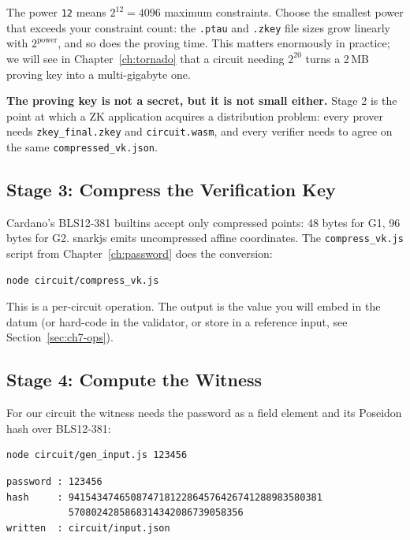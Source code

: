 The power \texttt{12} means $2^{12} = 4096$ maximum constraints. Choose the
smallest power that exceeds your constraint count: the \texttt{.ptau} and
\texttt{.zkey} file sizes grow linearly with $2^{\text{power}}$, and so does the
proving time. This matters enormously in practice; we will see in
Chapter~\ref{ch:tornado} that a circuit needing $2^{20}$ turns a 2\,MB
proving key into a multi-gigabyte one.

\begin{highlight}
\textbf{The proving key is not a secret, but it is not small either.}
Stage 2 is the point at which a ZK application acquires a distribution problem:
every prover needs \texttt{zkey\_final.zkey} and \texttt{circuit.wasm}, and
every verifier needs to agree on the same \texttt{compressed\_vk.json}.
\end{highlight}

\subsection*{Stage 3: Compress the Verification Key}

Cardano's BLS12-381 builtins accept only compressed points: 48 bytes for G1,
96 bytes for G2. snarkjs emits uncompressed affine coordinates. The
\texttt{compress\_vk.js} script from Chapter~\ref{ch:password} does the
conversion:

\begin{verbatim}
node circuit/compress_vk.js
\end{verbatim}

This is a per-circuit operation. The output is the value you will embed in the
datum (or hard-code in the validator, or store in a reference input, see
Section~\ref{sec:ch7-ops}).

\subsection*{Stage 4: Compute the Witness}

For our circuit the witness needs the password as a field element and its
Poseidon hash over BLS12-381:

\begin{verbatim}
node circuit/gen_input.js 123456
\end{verbatim}

\begin{verbatim}
password : 123456
hash     : 941543474650874718122864576426741288983580381
           5708024285868314342086739058356
written  : circuit/input.json
\end{verbatim}

